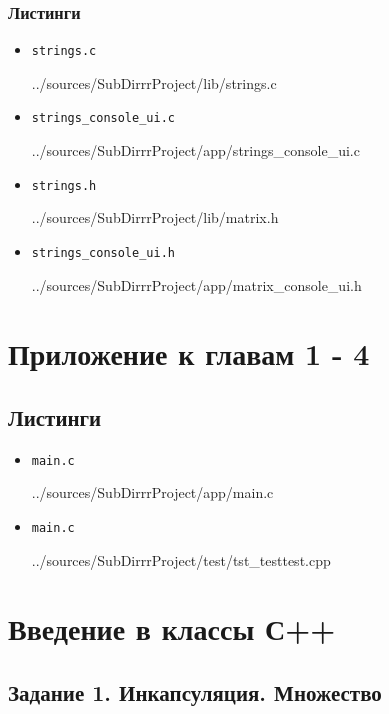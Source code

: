 \documentclass[12pt,a4paper]{report}
\begin{document}
\subsection*{Листинги}

\begin{itemize}
\item[] \verb-strings.c-

{../sources/SubDirrrProject/lib/strings.c}
\item[] \verb-strings_console_ui.c-

{../sources/SubDirrrProject/app/strings_console_ui.c}
\item[] \verb-strings.h-

{../sources/SubDirrrProject/lib/matrix.h}
\item[] \verb-strings_console_ui.h-

{../sources/SubDirrrProject/app/matrix_console_ui.h}
\end{itemize}
%

\chapter{Приложение к главам 1 - 4}

\section{Листинги}
\begin{itemize}
\item[] \verb-main.c-

{../sources/SubDirrrProject/app/main.c}
\item[] \verb-main.c-

{../sources/SubDirrrProject/test/tst_testtest.cpp}
\end{itemize}
%

\chapter{Введение в классы С++}
\section{Задание 1. Инкапсуляция. Множество}
\end{document}

